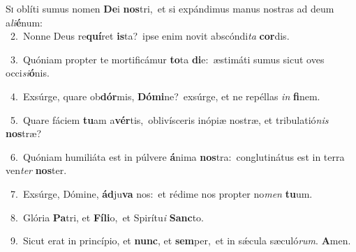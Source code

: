 \lettrine{\initial\textcolor{\initialcolor}{S}}{i} oblíti sumus nomen \textbf{De}\-i \textbf{nos}\-tri,~\star et si expándimus manus nostras ad deum a\-\textit{li}\-\textbf{é}num:\\
{\numbfont\textcolor{\numbcolor}{~2.}}~Nonne Deus re\-\textbf{quí}\-ret \textbf{is}\-ta?~\star ipse enim novit abscóndi\textit{ta} \textbf{cor}\-dis.\par
{\numbfont\textcolor{\numbcolor}{~3.}}~Quóniam propter te mortificámur \textbf{to}\-ta \textbf{di}\-e:~\star æstimáti sumus sicut oves occi\-\textit{si}\-\textbf{ó}nis.\par
{\numbfont\textcolor{\numbcolor}{~4.}}~Exsúrge, quare ob\-\textbf{dór}\-mis, \textbf{Dó}\-\textbf{mi}ne?~\star exsúrge, et ne repéllas \textit{in} \textbf{fi}\-nem.\par
{\numbfont\textcolor{\numbcolor}{~5.}}~Quare fáciem \textbf{tu}\-am a\-\textbf{vér}\-tis,~\star oblivísceris inópiæ nostræ, et tribulatió\textit{nis} \textbf{nos}\-træ?\par
{\numbfont\textcolor{\numbcolor}{~6.}}~Quóniam humiliáta est in púlvere \textbf{á}\-nima \textbf{nos}\-tra:~\star conglutinátus est in terra ven\textit{ter} \textbf{nos}\-ter.\par
{\numbfont\textcolor{\numbcolor}{~7.}}~Exsúrge, Dómine, \textbf{ád}\-ju\textbf{va} nos:~\star et rédime nos propter no\textit{men} \textbf{tu}\-um.\par
{\numbfont\textcolor{\numbcolor}{~8.}}~Glória \textbf{Pa}\-tri, et \textbf{Fí}\-\textbf{li}o,~\star et Spirítu\textit{i} \textbf{Sanc}\-to.\par
{\numbfont\textcolor{\numbcolor}{~9.}}~Sicut erat in princípio, et \textbf{nunc}\-, et \textbf{sem}\-per,~\star et in sǽcula sæculó\-\textit{rum}\-. \textbf{A}\-men.\par
